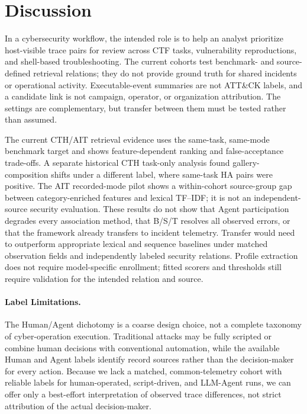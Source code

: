 \documentclass[10pt]{article}
\begin{document}
\section{Discussion}
In a cybersecurity workflow, the intended role is to help an analyst prioritize host-visible trace pairs for review across CTF tasks, vulnerability reproductions, and shell-based troubleshooting. The current cohorts test benchmark- and source-defined retrieval relations; they do not provide ground truth for shared incidents or operational activity. Executable-event summaries are not ATT\&CK labels, and a candidate link is not campaign, operator, or organization attribution. The settings are complementary, but transfer between them must be tested rather than assumed.

The current CTH/AIT retrieval evidence uses the same-task, same-mode benchmark target and shows feature-dependent ranking and false-acceptance trade-offs. A separate historical CTH task-only analysis found gallery-composition shifts under a different label, where same-task HA pairs were positive. The AIT recorded-mode pilot shows a within-cohort source-group gap between category-enriched features and lexical TF--IDF; it is not an independent-source security evaluation. These results do not show that Agent participation degrades every association method, that B/S/T resolves all observed errors, or that the framework already transfers to incident telemetry. Transfer would need to outperform appropriate lexical and sequence baselines under matched observation fields and independently labeled security relations. Profile extraction does not require model-specific enrollment; fitted scorers and thresholds still require validation for the intended relation and source.

\paragraph{Label Limitations.} The Human/Agent dichotomy is a coarse design choice, not a complete taxonomy of cyber-operation execution. Traditional attacks may be fully scripted or combine human decisions with conventional automation, while the available Human and Agent labels identify record sources rather than the decision-maker for every action. Because we lack a matched, common-telemetry cohort with reliable labels for human-operated, script-driven, and LLM-Agent runs, we can offer only a best-effort interpretation of observed trace differences, not strict attribution of the actual decision-maker.
\end{document}
